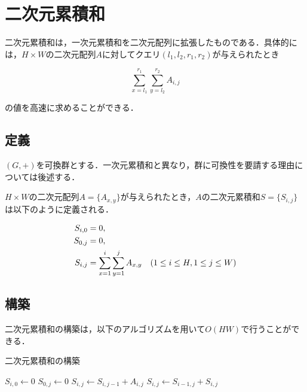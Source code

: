 \documentclass[11pt]{jsreport}
\theoremstyle{plain} %
\theoremstyle{definition}
\begin{document}
\section{二次元累積和}

二次元累積和は，一次元累積和を二次元配列に拡張したものである．具体的には，$H \times W$の二次元配列$A$に対してクエリ$(l_1, l_2, r_1, r_2)$が与えられたとき

\begin{equation}
    \sum_{x=l_1}^{r_1} \sum_{y=l_2}^{r_2} A_{i, j}
\end{equation}

の値を高速に求めることができる．

\subsection{定義}
$(G, +)$を可換群とする．一次元累積和と異なり，群に可換性を要請する理由については後述する．

$H \times W$の二次元配列$A = \{A_{x, y}\}$が与えられたとき，$A$の二次元累積和$S = \{S_{i, j}\}$は以下のように定義される．

\begin{align}
    S_{i, 0} &= 0, \notag \\
    S_{0, j} &= 0, \notag \\
    S_{i, j} &= \sum_{x=1}^{i} \sum_{y=1}^{j} A_{x, y} \quad (1 \leq i \leq H, 1 \leq j \leq W)
\end{align}

\subsection{構築}
二次元累積和の構築は，以下のアルゴリズムを用いて$O(HW)$で行うことができる．

\begin{algorithm}
    \caption{二次元累積和の構築}
    \begin{algorithmic}[1]
        \STATE $S_{i, 0} \leftarrow 0$
        \ENDFOR
        \STATE $S_{0, j} \leftarrow 0$
        \ENDFOR
        \STATE $S_{i, j} \leftarrow S_{i,j-1} + A_{i,j}$
        \ENDFOR
        \ENDFOR
        \STATE $S_{i, j} \leftarrow S_{i-1,j} + S_{i,j}$
        \ENDFOR
        \ENDFOR
    \end{algorithmic}
\end{algorithm}
\end{document}
